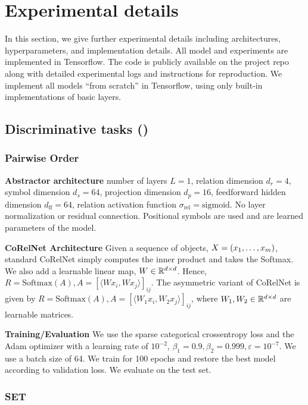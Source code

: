 \section{Experimental details}\label{sec:experimental_details}

In this section, we give further experimental details including architectures, hyperparameters, and implementation details. All model and experiments are implemented in Tensorflow. The code is publicly available on the project repo along with detailed experimental logs and instructions for reproduction. We implement all models ``from scratch'' in Tensorflow, using only built-in implementations of basic layers.

\subsection{Discriminative tasks ()}

\subsubsection{Pairwise Order}
\textbf{Abstractor architecture} number of layers $L = 1$, relation dimension $d_r = 4$, symbol dimension $d_s = 64$, projection dimension $d_p = 16$, feedforward hidden dimension $d_{\mathrm{ff}} = 64$, relation activation function $\sigma_{\mathrm{rel}} = \mathrm{sigmoid}$. No layer normalization or residual connection. Positional symbols are used  and are learned parameters of the model.

\textbf{CoRelNet Architecture} Given a sequence of objects, $X = (x_1, \ldots, x_m)$, standard CoRelNet simply computes the inner product and takes the Softmax. We also add a learnable linear map, $W \in \mathbb{R}^{d \times d}$. Hence, $R = \text{Softmax}(A), A = {\left[\langle W x_i, W x_j\rangle\right]}_{ij}$. The asymmetric variant of CoRelNet is given by $R = \text{Softmax}(A), A = {\left[\langle W_1 x_i, W_2 x_j\rangle\right]}_{ij}$, where $W_1, W_2 \in \mathbb{R}^{d \times d}$ are learnable matrices.

\textbf{Training/Evaluation} We use the sparse categorical crossentropy loss and the Adam optimizer with a learning rate of $10^{-2}$, $\beta_1 = 0.9, \beta_2 = 0.999, \varepsilon = 10^{-7}$. We use a batch size of 64. We train for 100 epochs and restore the best model according to validation loss. We evaluate on the test set.

\subsubsection{SET}

